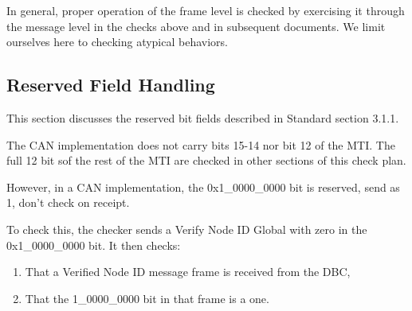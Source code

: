 \documentclass[11pt]{article}
\begin{document}
In general, proper operation of the frame level is checked by 
exercising it through the message level in the checks above and in subsequent 
documents.  We limit ourselves here to checking atypical behaviors.

\subsection{Reserved Field Handling}

This section discusses the reserved bit fields described in Standard section 3.1.1.

The CAN implementation does not carry bits 15-14 nor bit 12 of the MTI. 
The full 12 bit sof the rest of the MTI are checked in other sections of this check plan.

However, in a CAN implementation, the 0x1\_0000\_0000 bit is reserved, send as 1, 
don't check on receipt.

To check this, the checker sends a Verify Node ID Global with zero in the 0x1\_0000\_0000
bit. It then checks:

\begin{enumerate}
\item That a Verified Node ID message frame is received from the DBC,
\item That the 1\_0000\_0000 bit in that frame is a one.
\end{enumerate}
\end{document}
